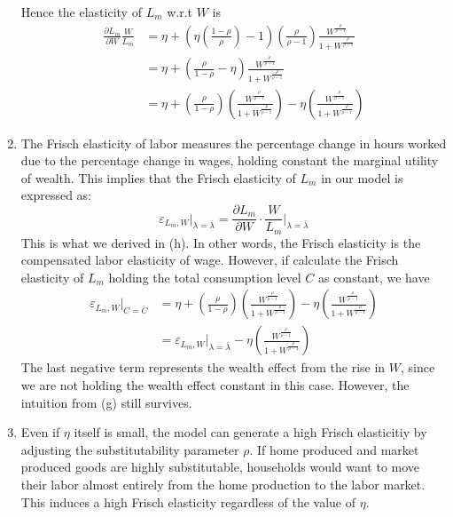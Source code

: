 \documentclass[11pt]{amsart}
\begin{document}
\begin{enumerate}[label = (\alph*)]
\begin{dmath*}
	\end{dmath*}
	Hence the elasticity of $L_m$ w.r.t $W$ is
	\begin{align*}
	\frac{\partial L_m}{\partial W} \frac{W}{L_m} &= \eta + \left( \eta \left( \frac{1-\rho}{\rho} \right) -1  \right) \left( \frac{\rho}{\rho-1} \right) \frac{W^{\frac{\rho}{\rho-1}}}{1 + W^{\frac{\rho}{\rho-1}}} \\
	& = \eta + \left(  \frac{\rho}{1-\rho} - \eta \right) \frac{W^{\frac{\rho}{\rho-1}}}{1 + W^{\frac{\rho}{\rho-1}}} \\
	& =  \eta + \left( \frac{\rho}{1-\rho} \right) \left( \frac{W^{\frac{\rho}{\rho-1}}}{1 + W^{\frac{\rho}{\rho-1}}} \right) - \eta \left(  \frac{W^{\frac{\rho}{\rho-1}}}{1 + W^{\frac{\rho}{\rho-1}}}  \right)
	\end{align*}
	\item The Frisch elasticity of labor measures the percentage change in hours worked due to the percentage change in wages, holding constant the marginal utility of wealth. This implies that the Frisch elasticity of $L_m$ in our model is expressed as:
    \begin{equation*}
    \varepsilon_{L_m, W} \big|_{\lambda = \bar{\lambda}} = \frac{\partial L_m}{\partial W} \cdot \frac{W}{L_m} \big|_{\lambda = \bar{\lambda}}
    \end{equation*}
    This is what we derived in (h). In other words, the Frisch elasticity is the compensated labor elasticity of wage. However, if calculate the Frisch elasticity of $L_m$ holding the total consumption level $C$ as constant, we have 
    \begin{align*}
    \varepsilon_{L_m, W}\big|_{C = \bar{C}} &= \eta + \left( \frac{\rho}{1-\rho} \right) \left( \frac{W^{\frac{\rho}{\rho-1}}}{1 + W^{\frac{\rho}{\rho-1}}} \right) - \eta \left(  \frac{W^{\frac{\rho}{\rho-1}}}{1 + W^{\frac{\rho}{\rho-1}}}  \right) \\
    & = \varepsilon_{L_m, W} \big|_{\lambda = \bar{\lambda}} - \eta \left(  \frac{W^{\frac{\rho}{\rho-1}}}{1 + W^{\frac{\rho}{\rho-1}}}  \right)
    \end{align*}
    The last negative term represents the wealth effect from the rise in $W$, since we are not holding the wealth effect constant in this case. However, the intuition from (g) still survives. 
    
	\item Even if $\eta$ itself is small, the model can generate a high Frisch elasticitiy by adjusting the substitutability parameter $\rho$. If home produced and market produced goods are highly substitutable, households would want to move their labor almost entirely from the home production to the labor market. This induces a high Frisch elasticity regardless of the value of $\eta$. 

\end{enumerate}
\end{document}

